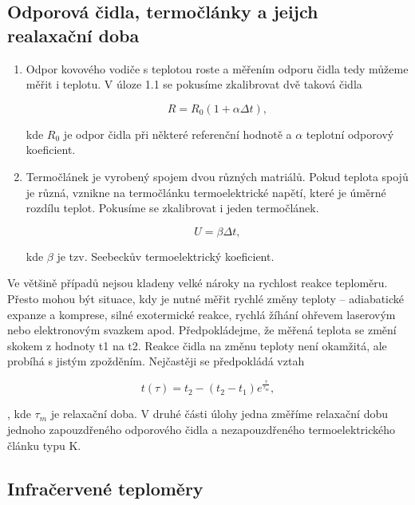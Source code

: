 \documentclass[a4paper,11pt]{article}
\begin{document}
\subsection{Odporová čidla, termočlánky a jeijch realaxační doba}

\begin{enumerate}
\item Odpor kovového vodiče s teplotou roste a měřením odporu čidla tedy můžeme měřit i teplotu. 
V úloze 1.1 se pokusíme zkalibrovat dvě taková čidla

\begin{equation}
R = R_0(1+\alpha \Delta t),
\end{equation}

kde $R_0$ je odpor čidla při některé referenční hodnotě a $\alpha$ teplotní odporový koeficient.  

\item Termočlánek je vyrobený spojem dvou různých matriálů. Pokud teplota spojů je různá, 
vznikne na termočlánku termoelektrické napětí, které je úměrné rozdílu teplot. Pokusíme se zkalibrovat i jeden termočlánek.

\begin{equation}
U=\beta\Delta t,
\end{equation}

kde $\beta$ je tzv. Seebeckův termoelektrický koeficient.
\end{enumerate}

Ve většině případů nejsou kladeny velké nároky na rychlost reakce teploměru. Přesto mohou být situace, kdy je
nutné měřit rychlé změny teploty – adiabatické expanze a komprese, silné exotermické reakce,
rychlá žíhání ohřevem laserovým nebo elektronovým svazkem apod.
Předpokládejme, že měřená teplota se změní skokem z hodnoty t1 na t2. Reakce čidla na změnu
teploty není okamžitá, ale probíhá s jistým zpožděním. Nejčastěji se předpokládá vztah

\begin{equation}
  t(\tau) = t_2 - (t_2-t_1)e^{\frac{\tau}{\tau_m}},
\end{equation}

, kde $\tau_m$ je relaxační doba. V druhé části úlohy jedna změříme relaxační dobu
jednoho zapouzdřeného odporového čidla a nezapouzdřeného termoelektrického článku typu K.

\subsection{Infračervené teploměry}
\end{document}
